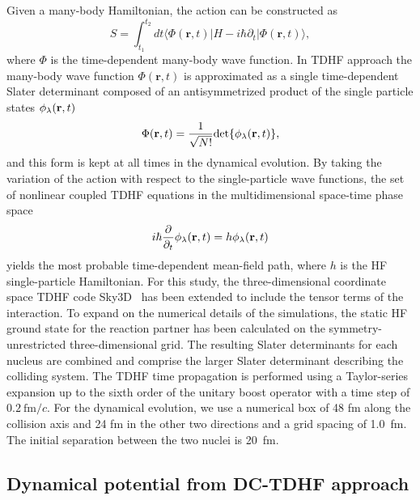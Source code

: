 \documentclass[aps,prc,twocolumn,showpacs,superscriptaddress,longbibliography,floatfix,10pt]{revtex4-1}
\begin{document}
Given a many-body Hamiltonian, the action can be constructed as
\begin{equation}
S=\int_{t_1}^{t_2} dt \langle \Phi(\textbf{r}, t)|H-i\hbar \partial_t|\Phi(\textbf{r}, t)\rangle ,
\end{equation}
where $\Phi$ is the time-dependent many-body wave function.
In TDHF approach the many-body wave function $\Phi(\mathbf{r}, t)$ is approximated as a single time-dependent Slater determinant composed of an antisymmetrized product
of the single particle states $\phi_{\rm{\lambda}}(\mathbf{r}, t)$
\begin{equation}
\Phi(\mathbf{r}, t)=\frac{1}{\sqrt{N!}}\textrm{det}\{\phi_{\rm{\lambda}}(\mathbf{r}, t)\},
\end{equation}
and this form is kept at all times in the dynamical evolution.
By taking the variation of the action with respect to the single-particle wave functions, the set of nonlinear coupled TDHF equations in the multidimensional
space-time phase space
\begin{equation}
i\hbar \frac{\partial}{\partial_t}\phi_{\rm{\lambda}}(\mathbf{r}, t)=h\phi_{\rm{\lambda}}(\mathbf{r}, t)
\end{equation}
yields the most probable time-dependent mean-field path, where $h$ is the HF single-particle Hamiltonian.
For this study, the three-dimensional coordinate space TDHF code Sky3D~\cite{maruhn2014} has been extended to include the tensor terms of the interaction.
To expand on the numerical details of the simulations, the static HF ground state for the reaction partner has been calculated on the symmetry-unrestricted three-dimensional grid.
The resulting Slater determinants for each nucleus are combined and comprise the larger Slater determinant describing the colliding system.
The TDHF time propagation is performed using a Taylor-series expansion up to the sixth order of the unitary boost operator with a time step of $0.2 ~\mathrm {fm}/c$.
For the dynamical evolution, we use a numerical box of 48 fm along the collision axis and 24 fm in the other two directions and a grid spacing of 1.0~fm.
The initial separation between the two nuclei is 20~fm.

\subsection{Dynamical potential from DC-TDHF approach}
\end{document}
